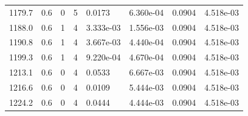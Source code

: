 \documentclass[preview]{standalone}
\begin{document}
{{{{{\begin{tabular}{L{1.2cm}C{1.2cm} C{0.3cm}C{0.5cm} C{1.4cm}C{1.4cm} C{1.4cm}C{1.4cm}}
  1179.7  &   0.6  & 0     &  5 &  0.0173  & 6.360e-04  & 0.0904 &  4.518e-03   \\ 
  1188.0  &   0.6  & 1     &  4 &  3.333e-03  & 1.556e-03  & 0.0904 &  4.518e-03   \\ 
  1190.8  &   0.6  & 1     &  4 &  3.667e-03  & 4.440e-04  & 0.0904 &  4.518e-03   \\ 
  1199.3  &   0.6  & 1     &  4 &  9.220e-04  & 4.670e-04  & 0.0904 &  4.518e-03   \\ 
  1213.1  &   0.6  & 0     &  4 &  0.0533  & 6.667e-03  & 0.0904 &  4.518e-03   \\ 
  1216.6  &   0.6  & 0     &  4 &  0.0109  & 5.444e-03  & 0.0904 &  4.518e-03   \\ 
  1224.2  &   0.6  & 0     &  4 &  0.0444  & 4.444e-03  & 0.0904 &  4.518e-03   \\ 
\hline 
\end{tabular} 

}}}}}
\end{document}
